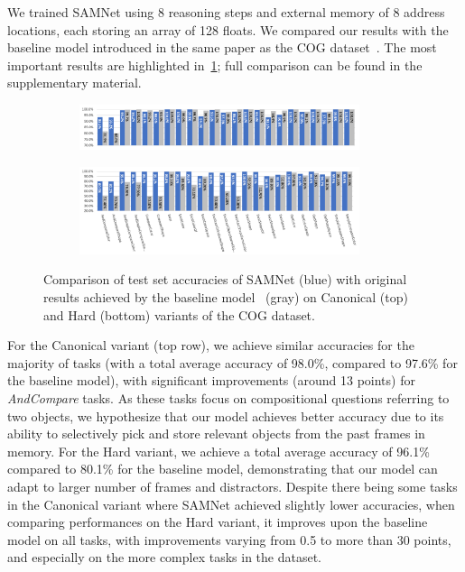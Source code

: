 We trained SAMNet using 8 reasoning steps and external memory of 8 address locations, each storing an array of 128 floats. 
We compared our results with the baseline model introduced in the same paper as the COG dataset~\cite{yang2018dataset}.
The most important results are highlighted in~\cref{fig:samnet_cog_detailed}; full comparison can be found in the supplementary material.%

\begin{figure}[htb]
	\centering
	\begin{subfigure}{\textwidth}
		\centering
		\includegraphics[width=0.9\textwidth]{img/results/samnet_cog_orig_canonical_no_labels.png}
	\end{subfigure}%
	\newline
	\begin{subfigure}{\textwidth}
		\centering
		\includegraphics[width=0.9\textwidth]{img/results/samnet_cog_orig_hard.png}
	\end{subfigure}%
	\caption{Comparison of test set accuracies of SAMNet (blue) with original results achieved by the 
		baseline model~\cite{yang2018dataset} (gray) on Canonical (top) and Hard (bottom) variants of the COG dataset.}
	\label{fig:samnet_cog_detailed}
\end{figure}

For the Canonical variant (top row), we achieve similar accuracies for the majority of tasks (with a total average accuracy of 98.0\%, 
compared to 97.6\% for the baseline model), with significant improvements (around 13 points) for \textit{AndCompare} tasks.
As these tasks focus on compositional questions referring to two objects, we hypothesize that our model achieves better 
accuracy due to its ability to selectively pick and store relevant objects from the past frames in memory.
For the Hard variant, we achieve a total average accuracy of 96.1\% compared to 80.1\% for the baseline model, demonstrating
that our model can adapt to larger number of frames and distractors.
Despite there being some tasks in the Canonical variant where SAMNet achieved slightly lower accuracies,
when comparing performances on the Hard variant, it improves upon the baseline model on all tasks, 
with improvements varying from 0.5 to more than 30 points, and especially on the more complex tasks in the dataset.

